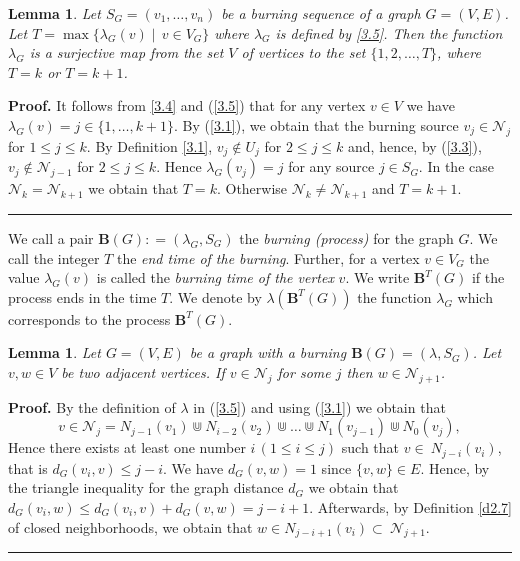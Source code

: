 \documentclass[a4paper, 11pt]{article}
\newtheorem{lemma}[theorem]{Lemma}
\newenvironment{proof}[1][Proof]{\textbf{#1.} }{\ \rule{0.5em}{0.5em}}
\begin{document}
\begin{lemma}\label{l3.2} Let $S_G=(v_1, \dots, v_n)$ be a burning sequence of a graph $G=(V,E)$.  Let $T=\max\{\lambda_G(v)\;|\;  \, v\in V_G\}$ where $\lambda_G$ is defined by \eqref{3.5}. Then the function $\lambda_G$ is a surjective map from  the set $V$ of vertices to the set  $\{1,2,\dots, T\}$,  
where  $T=k$ or $T=k+1$. 
\end{lemma} 
\begin{proof} It follows from \eqref{3.4}  and (\ref{3.5}) that for any vertex $v\in V$ we have $\lambda_G(v)=j\in \{1,\dots, k+1\}$.  By (\ref{3.1}),    we obtain that the burning source $v_j\in \mathcal N_j$ for $1\leq j \leq k$. By Definition \ref{3.1}, $v_j\notin U_j$ for $2\leq j\leq k$ and, hence, by (\ref{3.3}), $v_j\notin \mathcal N_{j-1}$ for $2\leq j\leq k$. Hence  $\lambda_G(v_j)=j$ for any  source 
$j\in S_G$.  In the case   $\mathcal N_k=\mathcal N_{k+1}$ we obtain that $T=k$. Otherwise $\mathcal N_k\ne \mathcal N_{k+1}$ and   $T=k+1$. 
\end{proof} 


 We call a pair $\mathbf B(G)\colon =(\lambda_G, S_G)$  the \emph{burning (process)} for the graph $G$. We call the integer $T$   the \emph{end time of the burning}. Further,   for a vertex $v\in V_G$ the value $\lambda_G(v)$ is called  the \emph{burning time of the vertex} $v$.   We write $\mathbf B^T(G)$   if the process ends in the  time $T$. We denote  by $\lambda(\mathbf  B^T(G))$ the function $\lambda_G$ which corresponds to the  process $\mathbf B^T(G)$.

\begin{lemma}\label{l3.3}
Let $G=(V,E)$ be a graph with a burning  $\mathbf  B(G)=(\lambda, S_G)$.    Let  $v,w\in V$ be  two adjacent vertices. If   $v\in \mathcal N_j$  for some $j$ then $w \in \mathcal N_{j+1}$.
\end{lemma}

\begin{proof}
By the definition  of $\lambda$ in (\ref{3.5})  and using (\ref{3.1}) we obtain that 
$$
v\in \mathcal N_j=N_{j-1} (v_1)\Cup N_{i-2}(v_2)\Cup \dots \Cup N_1(v_{j-1})\Cup N_0(v_j),
$$
Hence  there exists at least one number $i \, (1\leq i\leq j)$ such that $v\in~ N_{j-i}(v_i)$, that is $d_G(v_i, v)\leq j-i$. We have $d_G(v,w)=1$  since $\{v, w\}\in E$.  Hence, by the triangle inequality for the graph distance $d_G$ we obtain that 
$d_G(v_i,w)\leq  d_G(v_i,v)+ d_G(v,w) = j-i+1$. Afterwards,  by Definition  \ref{d2.7} of closed neighborhoods, we obtain that $w\in N_{j-i+1}(v_i)\subset~\mathcal N_{j+1}$.
\end{proof}
\end{document}
